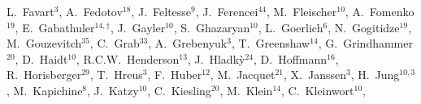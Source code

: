 \documentclass[12pt]{article}
\begin{document}
\begin{flushleft}
L.~Favart$^{3}$,               %
A.~Fedotov$^{18}$,             %
J.~Feltesse$^{9}$,             %
J.~Ferencei$^{44}$,            %
M.~Fleischer$^{10}$,           %
A.~Fomenko$^{19}$,             %
E.~Gabathuler$^{14,\dagger{}}$,          %
J.~Gayler$^{10}$,              %
S.~Ghazaryan$^{10}$,           %
L.~Goerlich$^{6}$,             %
N.~Gogitidze$^{19}$,           %
M.~Gouzevitch$^{35}$,          %
C.~Grab$^{33}$,                %
A.~Grebenyuk$^{3}$,            %
T.~Greenshaw$^{14}$,           %
G.~Grindhammer$^{20}$,         %
D.~Haidt$^{10}$,               %
R.C.W.~Henderson$^{13}$,       %
J.~Hladk\`y$^{24}$,            %
D.~Hoffmann$^{16}$,            %
R.~Horisberger$^{29}$,         %
T.~Hreus$^{3}$,                %
F.~Huber$^{12}$,               %
M.~Jacquet$^{21}$,             %
X.~Janssen$^{3}$,              %
H.~Jung$^{10,3}$,              %
M.~Kapichine$^{8}$,            %
J.~Katzy$^{10}$,               %
C.~Kiesling$^{20}$,            %
M.~Klein$^{14}$,               %
C.~Kleinwort$^{10}$,           %

\end{flushleft}
\end{document}
